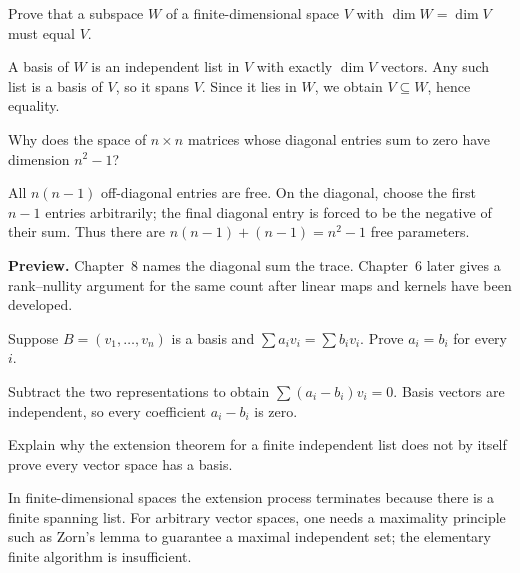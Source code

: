 \begin{problem}\label{prob:i03-problem-07}
Prove that a subspace $W$ of a finite-dimensional space $V$ with $\dim W=\dim V$ must equal $V$.
\end{problem}
\begin{solution}
A basis of $W$ is an independent list in $V$ with exactly $\dim V$ vectors. Any such list is a basis of $V$, so it spans $V$. Since it lies in $W$, we obtain $V\subseteq W$, hence equality.
\end{solution}

\begin{problem}\label{prob:i03-problem-08}
Why does the space of $n\times n$ matrices whose diagonal entries sum to zero have dimension $n^2-1$?
\end{problem}
\begin{solution}
All $n(n-1)$ off-diagonal entries are free. On the diagonal, choose the first $n-1$ entries arbitrarily; the final diagonal entry is forced to be the negative of their sum. Thus there are $n(n-1)+(n-1)=n^2-1$ free parameters.

\textbf{Preview.} Chapter~8 names the diagonal sum the trace. Chapter~6 later gives a rank--nullity argument for the same count after linear maps and kernels have been developed.
\end{solution}

\begin{problem}\label{prob:i03-problem-09}
Suppose $B=(v_1,\dots,v_n)$ is a basis and $\sum a_iv_i=\sum b_iv_i$. Prove $a_i=b_i$ for every $i$.
\end{problem}
\begin{solution}
Subtract the two representations to obtain $\sum(a_i-b_i)v_i=0$. Basis vectors are independent, so every coefficient $a_i-b_i$ is zero.
\end{solution}

\begin{problem}\label{prob:i03-problem-10}
Explain why the extension theorem for a finite independent list does not by itself prove every vector space has a basis.
\end{problem}
\begin{solution}
In finite-dimensional spaces the extension process terminates because there is a finite spanning list. For arbitrary vector spaces, one needs a maximality principle such as Zorn's lemma to guarantee a maximal independent set; the elementary finite algorithm is insufficient.
\end{solution}

